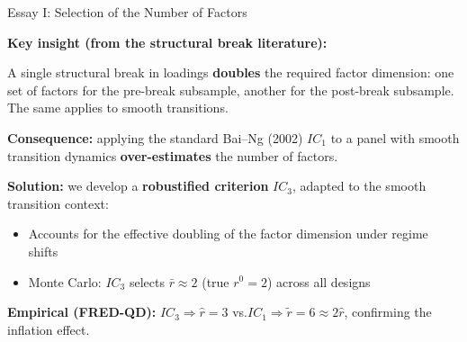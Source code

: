\documentclass{beamer}
\begin{document}
\begin{frame}{Essay I: Selection of the Number of Factors}

\textbf{Key insight (from the structural break literature):}

\begin{block}{}
A single structural break in loadings \textbf{doubles} the required factor dimension: one set of factors for the pre-break subsample, another for the post-break subsample. The same applies to smooth transitions.
\end{block}

\vspace{0.5em}
\textbf{Consequence:} applying the standard Bai--Ng (2002) $IC_1$ to a panel with smooth transition dynamics \textbf{over-estimates} the number of factors.

\vspace{0.4em}
\textbf{Solution:} we develop a \textbf{robustified criterion} $IC_3$, adapted to the smooth transition context:
\begin{itemize}
  \item Accounts for the effective doubling of the factor dimension under regime shifts
  \item Monte Carlo: $IC_3$ selects $\bar{r}\approx 2$ (true $r^0=2$) across all designs
\end{itemize}

\vspace{0.4em}
\textbf{Empirical (FRED-QD):} $IC_3 \Rightarrow \hat{r}=3$ \quad vs.\quad $IC_1 \Rightarrow \tilde{r}=6 \approx 2\hat{r}$, confirming the inflation effect.

\end{frame}
\end{document}

